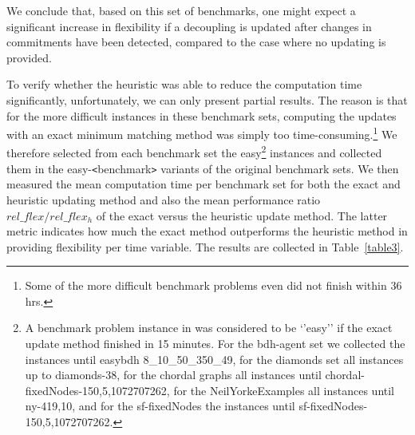 We conclude that, based on this set of benchmarks, one might expect a significant increase in flexibility if a decoupling is updated after changes in commitments have been detected, compared to the case where no updating is provided.

To verify whether the heuristic was able to reduce the computation time significantly, unfortunately, we can only present partial results.
The reason is that for the more difficult instances in these benchmark sets, computing the updates with an exact minimum matching method was simply too time-consuming.\footnote{Some of the more difficult benchmark problems even did not finish within 36 hrs.}
We therefore selected from each benchmark set the easy\footnote{A benchmark problem instance in \cite{planken:2013} was considered to be `'easy'' if the exact update method finished in 15 minutes.
For the bdh-agent set we collected the instances until easybdh 8\_10\_50\_350\_49, for the diamonds set all instances up to diamonds-38, for the chordal graphs all instances until chordal-fixedNodes-150,5,1072707262, for the NeilYorkeExamples all instances until ny-419,10, and for the sf-fixedNodes the instances until sf-fixedNodes-150,5,1072707262.} instances and collected them in the easy-\verb!<!benchmark\verb!>! variants of the original benchmark sets.
We then measured the mean computation time per benchmark set for both the exact and heuristic updating method and also the mean performance ratio $rel\_flex / rel\_flex_h$ of the
exact versus the heuristic update method. The latter metric indicates how much the exact method outperforms the heuristic method in providing flexibility per time variable.
The results are collected in Table~\ref{table3}.

